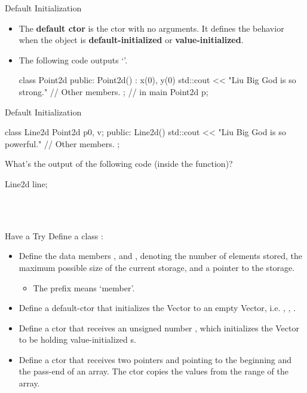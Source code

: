 \documentclass{beamer}
\begin{document}
\begin{frame}[fragile]{Default Initialization}
    \begin{itemize}
        \item The \textbf{default ctor} is the ctor with no arguments. It defines the behavior when the object is \textbf{default-initialized} or \textbf{value-initialized}.
        \item The following code outputs `'.
        \begin{cpp}
class Point2d {
 public:
  Point2d() : x(0), y(0) {
    std::cout << "Liu Big God is so strong.\n"
  }
  // Other members.
};
// in main
Point2d p;
        \end{cpp}
    \end{itemize}
\end{frame}

\begin{frame}[fragile]{Default Initialization}
    \begin{cpp}
class Line2d {
  Point2d p0, v;
 public:
  Line2d()
    { std::cout << "Liu Big God is so powerful.\n" }
  // Other members.
};
    \end{cpp}
    What's the output of the following code (inside the  function)?
    \begin{cpp}
Line2d line;
    \end{cpp}
    \\
    \\
\end{frame}

\begin{frame}[fragile]{Have a Try}
    Define a class :
    \begin{itemize}
        \item Define the data members ,  and , denoting the number of elements stored, the maximum possible size of the current storage, and a pointer to the storage.
        \begin{itemize}
            \item The prefix  means `member'.
        \end{itemize}
        \item Define a default-ctor that initializes the Vector to an empty Vector, i.e. , , .
        \item Define a ctor that receives an unsigned number , which initializes the Vector to be holding  value-initialized s.
        \item Define a ctor that receives two pointers  and  pointing to the beginning and the pass-end of an array. The ctor copies the values from the range of the array.
    \end{itemize}
\end{frame}
\end{document}
